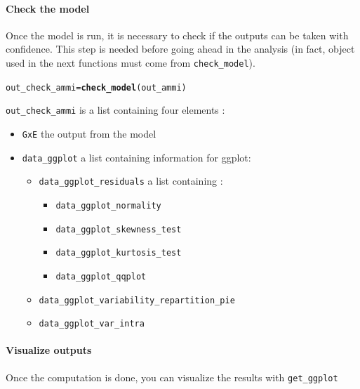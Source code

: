 \documentclass{book}\usepackage[]{graphicx}\usepackage[]{color}
\makeatletter
\newcommand{\hlstd}[1]{\textcolor[rgb]{0.345,0.345,0.345}{#1}}%
\newcommand{\hlkwb}[1]{\textcolor[rgb]{0.69,0.353,0.396}{#1}}%
\newcommand{\hlkwd}[1]{\textcolor[rgb]{0.737,0.353,0.396}{\textbf{#1}}}%
\newenvironment{kframe}{%
 \def\at@end@of@kframe{}%
 \ifinner\ifhmode%
  \def\at@end@of@kframe{\end{minipage}}%
  \begin{minipage}{\columnwidth}%
 \fi\fi%
 \def\FrameCommand##1{\hskip\@totalleftmargin \hskip-\fboxsep
 \colorbox{shadecolor}{##1}\hskip-\fboxsep
     \hskip-\linewidth \hskip-\@totalleftmargin \hskip\columnwidth}%
 \MakeFramed {\advance\hsize-\width
   \@totalleftmargin\z@ \linewidth\hsize
   \@setminipage}}%
 {\par\unskip\endMakeFramed%
 \at@end@of@kframe}
\newenvironment{knitrout}{}{} %
\makeatother
\begin{document}
\paragraph{Check the model}

Once the model is run, it is necessary to check if the outputs can be taken with confidence.
This step is needed before going ahead in the analysis (in fact, object used in the next functions must come from \texttt{check\_model}).

\begin{knitrout}
\color{fgcolor}\begin{kframe}
\begin{alltt}
\hlstd{out_check_ammi} \hlkwb{=} \hlkwd{check_model}\hlstd{(out_ammi)}
\end{alltt}
\end{kframe}
\end{knitrout}

\texttt{out\_check\_ammi} is a list containing four elements :

\begin{itemize}
\item \texttt{GxE} the output from the model
\item \texttt{data\_ggplot} a list containing information for ggplot:
  \begin{itemize}
  \item \texttt{data\_ggplot\_residuals} a list containing :
    \begin{itemize}
    \item \texttt{data\_ggplot\_normality}
    \item \texttt{data\_ggplot\_skewness\_test}
    \item \texttt{data\_ggplot\_kurtosis\_test}
    \item \texttt{data\_ggplot\_qqplot}
    \end{itemize}
  \item \texttt{data\_ggplot\_variability\_repartition\_pie}
  \item \texttt{data\_ggplot\_var\_intra}
  \end{itemize}
\end{itemize}

\paragraph{Visualize outputs}

Once the computation is done, you can visualize the results with \texttt{get\_ggplot}
\end{document}
